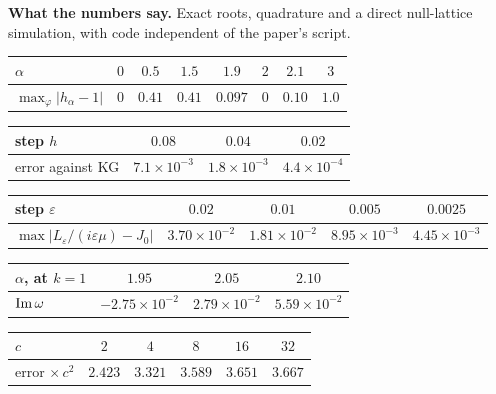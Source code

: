\documentclass[10pt]{article}
\newcommand{\eps}{\varepsilon}
\begin{document}
\vspace{2pt}
\begin{smallbox}
\textbf{What the numbers say.} Exact roots, quadrature and a direct null-lattice simulation, with code independent of the paper's script.\par\vspace{2pt}
{\renewcommand{\arraystretch}{1.0}\setlength{\tabcolsep}{4pt}
\begin{tabular}[t]{@{}l c c c c c c c@{}}
\toprule
$\alpha$ & $0$ & $0.5$ & $1.5$ & $1.9$ & $2$ & $2.1$ & $3$\\
\midrule
$\max_\varphi|h_\alpha-1|$ & $0$ & $0.41$ & $0.41$ & $0.097$ & $0$ & $0.10$ & $1.0$\\
\bottomrule
\end{tabular}\hfill
\begin{tabular}[t]{@{}l c c c@{}}
\toprule
step $h$ & $0.08$ & $0.04$ & $0.02$\\
\midrule
error against KG & $7.1\times10^{-3}$ & $1.8\times10^{-3}$ & $4.4\times10^{-4}$\\
\bottomrule
\end{tabular}}\par\vspace{3pt}
{\renewcommand{\arraystretch}{1.0}\setlength{\tabcolsep}{4pt}
\begin{tabular}[t]{@{}l c c c c@{}}
\toprule
step $\eps$ & $0.02$ & $0.01$ & $0.005$ & $0.0025$\\
\midrule
$\max|L_\eps/(i\eps\mu)-J_0|$ & $3.70\times10^{-2}$ & $1.81\times10^{-2}$ & $8.95\times10^{-3}$ & $4.45\times10^{-3}$\\
\bottomrule
\end{tabular}\hfill
\begin{tabular}[t]{@{}l c c c@{}}
\toprule
$\alpha$, at $k=1$ & $1.95$ & $2.05$ & $2.10$\\
\midrule
${\rm Im}\,\omega$ & $-2.75\times10^{-2}$ & $2.79\times10^{-2}$ & $5.59\times10^{-2}$\\
\bottomrule
\end{tabular}}\par\vspace{2pt}
{\renewcommand{\arraystretch}{1.0}\setlength{\tabcolsep}{4pt}
\begin{tabular}[t]{@{}l c c c c c@{}}
\toprule
$c$ & $2$ & $4$ & $8$ & $16$ & $32$\\
\midrule
error $\times\,c^2$ & $2.423$ & $3.321$ & $3.589$ & $3.651$ & $3.667$\\
\bottomrule
\end{tabular}\hfill
}
\end{smallbox}
\end{document}
